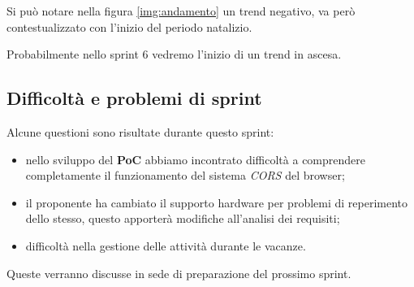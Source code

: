 Si può notare nella figura \ref{img:andamento} un trend negativo, va però contestualizzato con l'inizio del periodo natalizio.

Probabilmente nello sprint 6 vedremo l'inizio di un trend in ascesa.

\subsection{Difficoltà e problemi di sprint}

Alcune questioni sono risultate durante questo sprint:

\begin{itemize}
    \item nello sviluppo del \textbf{PoC} abbiamo incontrato difficoltà a comprendere completamente il funzionamento del sistema \textit{CORS} del browser;
    \item il proponente ha cambiato il supporto hardware per problemi di reperimento dello stesso, questo apporterà modifiche all'analisi dei requisiti;
    \item difficoltà nella gestione delle attività durante le vacanze.
\end{itemize}

Queste verranno discusse in sede di preparazione del prossimo sprint.
